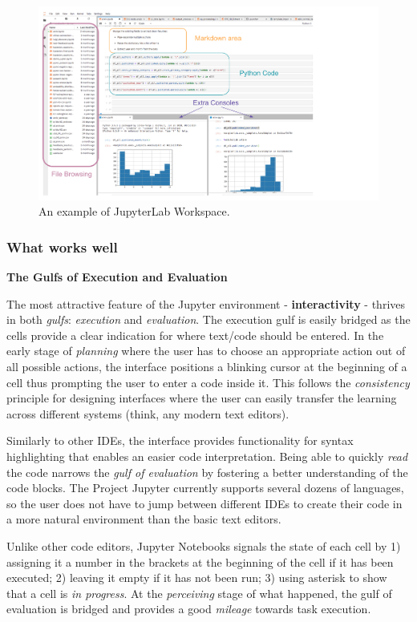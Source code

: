 \documentclass[12pt,letterpaper]{article}
\begin{document}
\begin{figure}[hbt!]
\centering
\includegraphics[scale=.5]{figures/project-principles/jupyter.png}
\caption{An example of JupyterLab Workspace.}
\label{fig::1}
\end{figure}

\subsubsection*{What works well}

\textbf{The Gulfs of Execution and Evaluation}

The most attractive feature of the Jupyter environment - \textbf{interactivity} - thrives in both \textit{gulfs}: \textit{execution} and \textit{evaluation}. The execution gulf is easily bridged as the cells provide a clear indication for where text/code should be entered. In the early stage of \textit{planning} where the user has to choose an appropriate action out of all possible actions, the interface positions a blinking cursor at the beginning of a cell thus prompting the user to enter a code inside it. This follows the \textit{consistency} principle for designing interfaces where the user can easily transfer the learning across different systems (think, any modern text editors). 

Similarly to other IDEs, the interface provides functionality for syntax highlighting that enables an easier code interpretation. Being able to quickly \textit{read} the code narrows the \textit{gulf of evaluation} by fostering a better understanding of the code blocks. The Project Jupyter currently supports several dozens of languages, so the user does not have to jump between different IDEs to create their code in a more natural environment than the basic text editors. 

Unlike other code editors, Jupyter Notebooks signals the state of each cell by 1) assigning it a number in the brackets at the beginning of the cell if it has been executed; 2) leaving it empty if it has not been run; 3) using asterisk to show that a cell is \textit{in progress}. At the \textit{perceiving} stage of what happened, the gulf of evaluation is bridged and provides a good \textit{mileage} towards task execution. 
\end{document}
